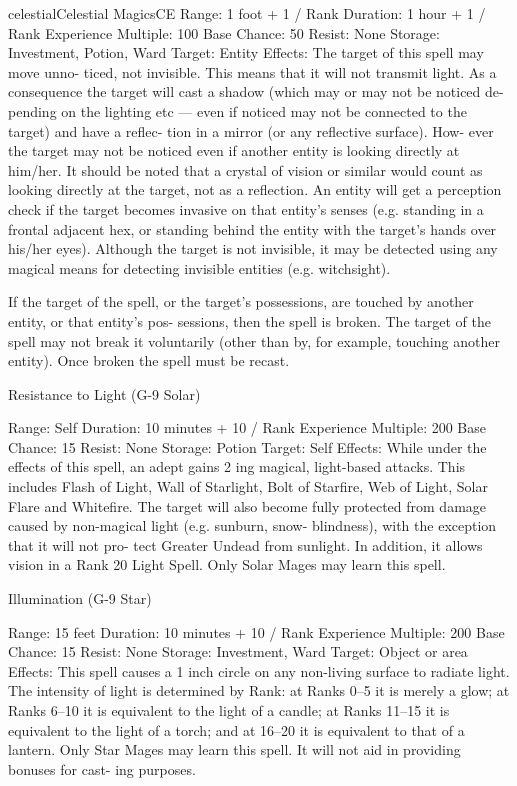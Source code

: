 \begin{College}[1.3]{celestial}{Celestial Magics}{CE}
Range: 1 foot + 1 / Rank 
Duration: 1 hour + 1 / Rank 
Experience Multiple: 100 
Base Chance: 50%
Resist: None 
Storage: Investment, Potion, Ward 
Target: Entity 
Effects:  The  target  of  this  spell  may  move  unno-
ticed,  not  invisible.  This  means  that  it  will  not 
transmit light. As a consequence the target will cast 
a  shadow  (which  may  or  may  not  be  noticed  de-
pending on the lighting etc — even if noticed may 
not  be  connected  to  the  target)  and  have  a  reflec-
tion  in  a  mirror  (or  any  reflective  surface).  How-
ever  the  target  may  not be noticed  even  if  another 
entity  is  looking  directly  at  him/her.  It  should  be 
noted  that  a  crystal  of  vision  or  similar  would 
count  as  looking  directly  at  the  target,  not  as  a 
reflection.  An  entity  will  get  a  perception check if 
the target becomes invasive on that entity’s senses 
(e.g. standing in a frontal adjacent hex, or standing 
behind  the  entity  with  the  target’s  hands  over 
his/her eyes). Although the target is not invisible, it 
may  be  detected  using  any  magical  means  for 
detecting invisible entities (e.g. witchsight). 

If the target of the spell, or the target’s possessions, 
are  touched  by  another  entity,  or  that  entity’s  pos-
sessions, then the spell is broken. The target of the 
spell  may  not  break  it  voluntarily  (other  than  by, 
for example, touching another entity). Once broken 
the spell must be recast. 

Resistance to Light (G-9 Solar) 

Range: Self 
Duration: 10 minutes + 10 / Rank 
Experience Multiple: 200 
Base Chance: 15%
Resist: None 
Storage: Potion 
Target: Self 
Effects:  While  under  the  effects  of  this  spell,  an 
adept gains 2%
ing  magical,  light-based  attacks.  This  includes 
Flash  of  Light,  Wall  of  Starlight,  Bolt  of  Starfire, 
Web of Light, Solar Flare and Whitefire. The target 
will  also  become  fully  protected  from  damage 
caused  by  non-magical  light  (e.g.  sunburn,  snow-
blindness),  with  the  exception  that  it  will  not  pro-
tect  Greater  Undead  from  sunlight.  In  addition,  it 
allows vision in a Rank 20 Light Spell. Only Solar 
Mages may learn this spell. 

Illumination (G-9 Star) 

Range: 15 feet 
Duration: 10 minutes + 10 / Rank 
Experience Multiple: 200 
Base Chance: 15%
Resist: None 
Storage: Investment, Ward 
Target: Object or area 
Effects:  This  spell  causes  a  1  inch  circle  on  any 
non-living surface to radiate light. The intensity of 
light  is  determined  by  Rank:  at  Ranks  0–5  it  is 
merely a glow; at Ranks 6–10 it is equivalent to the 
light of a candle; at Ranks 11–15 it is equivalent to 
the light of a torch; and at 16–20 it is equivalent to 
that  of  a  lantern.  Only  Star  Mages  may  learn  this 
spell.  It  will not aid in providing bonuses for cast-
ing purposes. 


\end{College}
